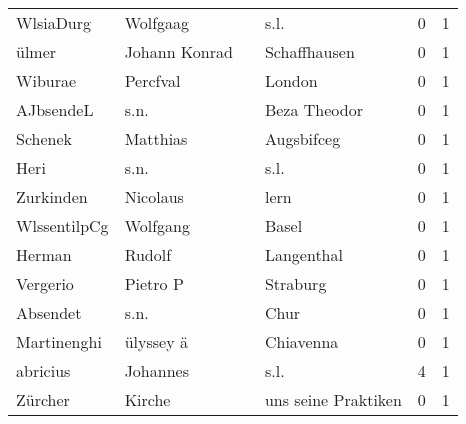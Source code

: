 \begin{tabular}{llllrr}
                WlsiaDurg &                           Wolfgaag &             &                                        s.l. &          0 &         1 \\
                    ülmer &                      Johann Konrad &             &                                Schaffhausen &          0 &         1 \\
                  Wiburae &                           Percfval &             &                                      London &          0 &         1 \\
                AJbsendeL &                               s.n. &             &                                Beza Theodor &          0 &         1 \\
                  Schenek &                           Matthias &             &                                  Augsbifceg &          0 &         1 \\
                     Heri &                               s.n. &             &                                        s.l. &          0 &         1 \\
                Zurkinden &                           Nicolaus &             &                                        lern &          0 &         1 \\
             WlssentilpCg &                           Wolfgang &             &                                       Basel &          0 &         1 \\
                   Herman &                             Rudolf &             &                                  Langenthal &          0 &         1 \\
                 Vergerio &                           Pietro P &             &                                    Straburg &          0 &         1 \\
                 Absendet &                               s.n. &             &                                        Chur &          0 &         1 \\
              Martinenghi &                          ülyssey ä &             &                                   Chiavenna &          0 &         1 \\
                 abricius &                           Johannes &             &                                        s.l. &          4 &         1 \\
                  Zürcher &                             Kirche &             &                         uns seine Praktiken &          0 &         1 \\

\end{tabular}

